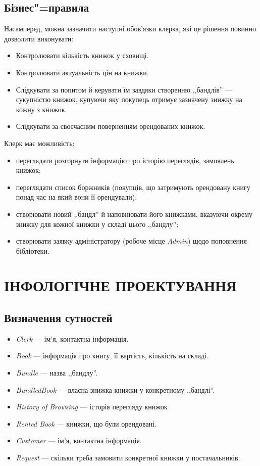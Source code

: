 \documentclass[a4paper,notitlepage,headsepline,pdftex,oneside]{report}
\newcommand{\setfontsize}[1]{\fontsize{#1pt}{#1pt}\selectfont}
\newcommand{\Chapter}[1]{\chapter{#1} \renewcommand{\baselinestretch}{1.5}\setfontsize{14pt}}
\newenvironment{itemizer}{\begin{itemize}[leftmargin=1.45cm]%
  \setlength{\itemsep}{1pt}%
  \setlength{\parskip}{0pt}
  \setlength{\parsep}{0pt}
  }{\end{itemize}}
\newcommand{\Section}[1]{\section{#1} \renewcommand{\baselinestretch}{1.5}\setfontsize{14pt}}
\begin{document}
  \Section{Бізнес"=правила}
    Насамперед, можна зазначити наступні обов’язки клерка, які це рішення
    повинно дозволити виконувати:
    \begin{itemizer}
      \item Контролювати кількість книжок у сховищі.
      \item Контролювати актуальність цін на книжки.
      \item Слідкувати за попитом й керувати їм завдяки створенню ,,бандлів''
        --- сукупністю книжок, купуючи яку покупець отримує зазначену знижку
        на кожну з книжок.
      \item Слідкувати за своєчасним поверненням орендованих книжок.
    \end{itemizer}

    Клерк має можливість:
    \begin{itemizer}
      \item переглядати розгорнути інформацію про історію переглядів,
        замовлень книжок;
      \item переглядати список боржників (покупців, що затримують орендовану
        книгу понад час на який вони її орендували);
      \item створювати новий ,,бандл'' й наповнювати його книжками, вказуючи
        окрему знижку для кожної книжки у складі цього ,,бандлу'';
      \item створювати заявку адміністратору (робоче місце \emph{Admin}) щодо
        поповнення бібліотеки.
    \end{itemizer}
  \clearpage
\Chapter{ІНФОЛОГІЧНЕ ПРОЕКТУВАННЯ}
  \Section{Визначення сутностей}
    \begin{itemizer}
      \item \emph{Clerk} --- ім’я, контактна інформація.
      \item \emph{Book} --- інформація про книгу, її вартість, кількість на
        складі.
      \item \emph{Bundle} --- назва ,,бандлу''.
      \item \emph{BundledBook} --- власна знижка книжки у конкретному
        ,,бандлі''.
      \item \emph{History of Browsing} --- історія перегляду книжок
      \item \emph{Rented Book} --- книжки, що були орендовані.
      \item \emph{Customer} --- ім’я, контактна інформація.
      \item \emph{Request} --- скільки треба замовити конкретної книжки у
        постачальників.
    \end{itemizer}
\end{document}
